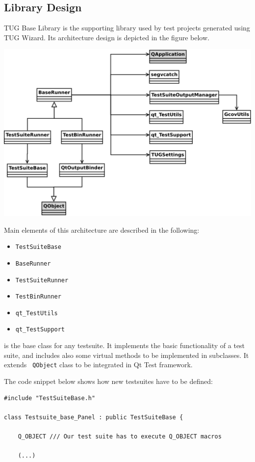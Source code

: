 
\subsection{Library Design}

TUG Base Library is the supporting library used by test projects
generated using TUG Wizard. Its architecture design is depicted in the
figure below. 

\vspace{2ex}
\includegraphics[width=.99\textwidth]{images/diag/tug_lib_classdiag.png}
\vspace{2ex}

Main elements of this architecture are described in the following:
\begin{itemize}
\item {\tt TestSuiteBase}
\item {\tt BaseRunner}
\item {\tt TestSuiteRunner}
\item {\tt TestBinRunner}
\item {\tt qt\_TestUtils}
\item {\tt qt\_TestSupport}
\end{itemize}

\newpage

 is the base class for any testsuite. It
implements the basic functionality of a test suite, and includes also
some virtual methods to be implemented in subclasses. It extends {\tt
  QObject} class to be integrated in Qt Test framework.


The code snippet below shows how new testsuites have to be defined:

\begin{lstlisting}
#include "TestSuiteBase.h"

class Testsuite_base_Panel : public TestSuiteBase {

    Q_OBJECT /// Our test suite has to execute Q_OBJECT macros

    (...)
\end{lstlisting}

